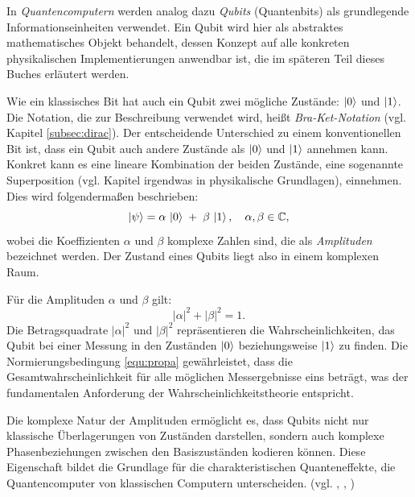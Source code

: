 In \emph{Quantencomputern} werden analog dazu \emph{Qubits} (Quantenbits) als grundlegende Informationseinheiten verwendet. Ein Qubit wird hier als abstraktes mathematisches Objekt behandelt, dessen Konzept auf alle konkreten physikalischen Implementierungen anwendbar ist, die im späteren Teil dieses Buches erläutert werden.

Wie ein klassisches Bit hat auch ein Qubit zwei mögliche Zustände: $\ket{0}$ und $\ket{1}$. Die Notation, die zur Beschreibung verwendet wird, heißt \emph{Bra-Ket-Notation} (vgl. Kapitel \ref{subsec:dirac}). Der entscheidende Unterschied zu einem konventionellen Bit ist, dass ein Qubit auch andere Zustände als $\ket{0}$ und $\ket{1}$ annehmen kann. Konkret kann es eine lineare Kombination der beiden Zustände, eine sogenannte Superposition (vgl. Kapitel irgendwas in physikalische Grundlagen), einnehmen. Dies wird folgendermaßen beschrieben:
\begin{equation}
    \ket{\psi} = \alpha\,\ket{0} \;+\; \beta\,\ket{1}, \quad \alpha, \beta \in \mathbb{C},
\end{equation}
wobei die Koeffizienten \(\alpha\) und \(\beta\) komplexe Zahlen sind, die als \emph{Amplituden} bezeichnet werden. Der Zustand eines Qubits liegt also in einem komplexen Raum.

Für die Amplituden \(\alpha\) und \(\beta\) gilt:
\begin{equation}
\label{equ:propa}
|\alpha|^2 + |\beta|^2 = 1.
\end{equation}
Die Betragsquadrate \(|\alpha|^2\) und \(|\beta|^2\) repräsentieren die Wahrscheinlichkeiten, das Qubit bei einer Messung in den Zuständen \(\ket{0}\) beziehungsweise \(\ket{1}\) zu finden. Die Normierungsbedingung \ref{equ:propa} gewährleistet, dass die Gesamtwahrscheinlichkeit für alle möglichen Messergebnisse eins beträgt, was der fundamentalen Anforderung der Wahrscheinlichkeitstheorie entspricht.

Die komplexe Natur der Amplituden ermöglicht es, dass Qubits nicht nur klassische Überlagerungen von Zuständen darstellen, sondern auch komplexe Phasenbeziehungen zwischen den Basiszuständen kodieren können. Diese Eigenschaft bildet die Grundlage für die charakteristischen Quanteneffekte, die Quantencomputer von klassischen Computern unterscheiden. (vgl. \cite[13 ff.]{nielsen_quantum_2010}, \cite[13 ff.]{rieffel_quantum_2011}, \cite{matuschak_quantum_2019})

